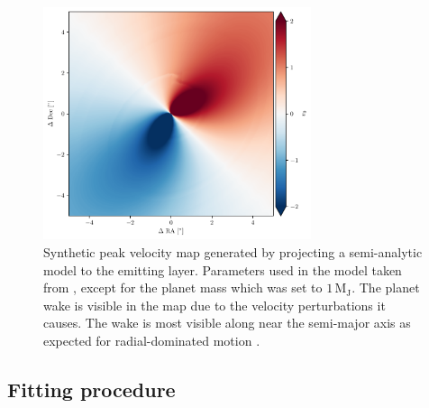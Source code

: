 \begin{figure}
    \centering
    \includegraphics[width = 0.7\textwidth]{figures/thesis_contours_obs_model.pdf}
    \caption{Synthetic peak velocity map generated by projecting a semi-analytic model to the emitting layer. Parameters used in the model taken from \citet{calcino2022}, except for the planet mass which was set to $1 \, \mathrm{M_J}$. The planet wake is visible in the map due to the velocity perturbations it causes. The wake is most visible along near the semi-major axis as expected for radial-dominated motion \citep{rafikov2002a,bollati2021a,calcino2022}.}
    \label{fig:model_v0}
\end{figure}

\subsection{Fitting procedure}

